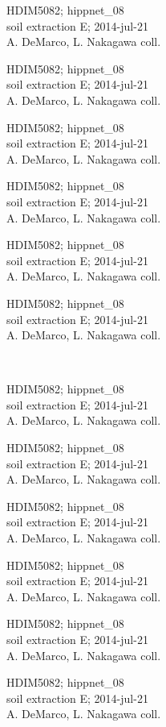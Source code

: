 \documentclass[2pt]{extarticle}
\begin{document}
\noindent
\parbox{0.16\textwidth}{\tiny \raggedright \rule[-0.3\baselineskip]{0pt}{10pt}HDIM5082; hippnet\_08\\ soil extraction E; 2014-jul-21\\ A. DeMarco, L. Nakagawa coll.}
\parbox{0.16\textwidth}{\tiny \raggedright \rule[-0.3\baselineskip]{0pt}{10pt}HDIM5082; hippnet\_08\\ soil extraction E; 2014-jul-21\\ A. DeMarco, L. Nakagawa coll.}
\parbox{0.16\textwidth}{\tiny \raggedright \rule[-0.3\baselineskip]{0pt}{10pt}HDIM5082; hippnet\_08\\ soil extraction E; 2014-jul-21\\ A. DeMarco, L. Nakagawa coll.}
\parbox{0.16\textwidth}{\tiny \raggedright \rule[-0.3\baselineskip]{0pt}{10pt}HDIM5082; hippnet\_08\\ soil extraction E; 2014-jul-21\\ A. DeMarco, L. Nakagawa coll.}
\parbox{0.16\textwidth}{\tiny \raggedright \rule[-0.3\baselineskip]{0pt}{10pt}HDIM5082; hippnet\_08\\ soil extraction E; 2014-jul-21\\ A. DeMarco, L. Nakagawa coll.}
\parbox{0.16\textwidth}{\tiny \raggedright \rule[-0.3\baselineskip]{0pt}{10pt}HDIM5082; hippnet\_08\\ soil extraction E; 2014-jul-21\\ A. DeMarco, L. Nakagawa coll.} \\ 
\vspace{0.001in} 

\noindent
\parbox{0.16\textwidth}{\tiny \raggedright \rule[-0.3\baselineskip]{0pt}{10pt}HDIM5082; hippnet\_08\\ soil extraction E; 2014-jul-21\\ A. DeMarco, L. Nakagawa coll.}
\parbox{0.16\textwidth}{\tiny \raggedright \rule[-0.3\baselineskip]{0pt}{10pt}HDIM5082; hippnet\_08\\ soil extraction E; 2014-jul-21\\ A. DeMarco, L. Nakagawa coll.}
\parbox{0.16\textwidth}{\tiny \raggedright \rule[-0.3\baselineskip]{0pt}{10pt}HDIM5082; hippnet\_08\\ soil extraction E; 2014-jul-21\\ A. DeMarco, L. Nakagawa coll.}
\parbox{0.16\textwidth}{\tiny \raggedright \rule[-0.3\baselineskip]{0pt}{10pt}HDIM5082; hippnet\_08\\ soil extraction E; 2014-jul-21\\ A. DeMarco, L. Nakagawa coll.}
\parbox{0.16\textwidth}{\tiny \raggedright \rule[-0.3\baselineskip]{0pt}{10pt}HDIM5082; hippnet\_08\\ soil extraction E; 2014-jul-21\\ A. DeMarco, L. Nakagawa coll.}
\parbox{0.16\textwidth}{\tiny \raggedright \rule[-0.3\baselineskip]{0pt}{10pt}HDIM5082; hippnet\_08\\ soil extraction E; 2014-jul-21\\ A. DeMarco, L. Nakagawa coll.} \\ 
\vspace{0.001in} 
\end{document}
